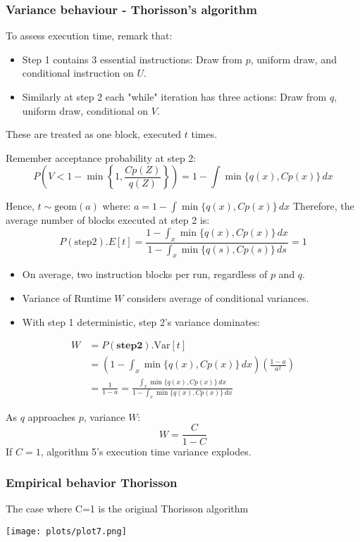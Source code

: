 \documentclass{beamer}
\begin{document}
\begin{frame}
\frametitle{Variance behaviour - Thorisson's algorithm}
To assess execution time, remark that:
\begin{itemize}
        \item Step 1 contains 3 essential instructions: Draw from $p$, uniform draw, and conditional instruction on $U$.
        \item Similarly at step 2 each "while" iteration has three actions: Draw from $q$, uniform draw, conditional on $V$.
\end{itemize} 
These are treated as one block, executed $t$ times.

Remember acceptance probability at step 2:
$$ P\left( V < 1 - \min\left\{1, \frac{Cp(Z)}{q(Z)}\right\}\right) = 1 - \int \min\{q(x), Cp(x)\} \, dx $$

Hence, $t \sim \text{geom}(a)$ where:
$ a = 1 - \int \min\{q(x), Cp(x)\} \, dx $
Therefore, the average number of blocks executed at step 2 is:
\[
P(\text{step2}).E[t] = \frac{1-\int_{x} \min\{q(x), Cp(x)\} \, dx}{1 - \int_{x} \min\{q(s), Cp(s)\} \, ds} = 1
\]
\end{frame}
\begin{frame}

\begin{itemize}
    \item On average, two instruction blocks per run, regardless of $p$ and $q$.
    \item Variance of Runtime $W$ considers average of conditional variances.
    \item With step 1 deterministic, step 2's variance dominates:
\end{itemize}
\begin{align*}
W &= P(\mathbf{step2}).\text{Var}[t] \\
&= \left(1 - \int_{x} \min\{q(x), Cp(x)\} \, dx\right)\left(\frac{1-a}{a^2}\right) \\
&= \frac{1}{1 - a} = \frac{\int_{x} \min\{q(x), Cp(x)\} \, dx}{1-\int_{x} \min\{q(x), Cp(x)\} \, dx}
\end{align*}

As $q$ approaches $p$, variance $W$:
$$ W = \frac{C}{1 - C} $$
If $C=1$, algorithm 5's execution time variance explodes.
\end{frame}
\begin{frame}
\frametitle{Empirical behavior Thorisson}
The case where C=1 is the original Thorisson algorithm
\begin{center}
\texttt{[image: plots/plot7.png]}
\end{center}
\end{frame}
\end{document}
